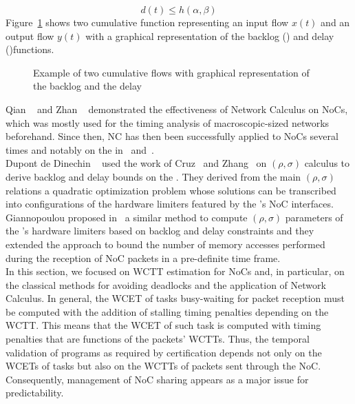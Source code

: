 \documentclass[main.tex]{subfiles}
\begin{document}
\begin{equation}
    \label{eq_stateOftheArt_NCdelay}
    d(t)  \leq h( \alpha , \beta )
\end{equation}
Figure~\ref{fig_stateOfTheArt_NCcumulCurves} shows two cumulative function representing an input flow $x(t)$ and an output flow  $y(t)$ with a graphical representation of the backlog () and delay ()functions.

\begin{figure}
    \centering
    \scalebox{1.3}{}
    \caption{Example of two cumulative flows with graphical representation of the backlog and the delay}
    \label{fig_stateOfTheArt_NCcumulCurves}
\end{figure}


Qian \etal~\cite{Qian2009, Qian2010} and Zhan \etal~\cite{Zhan2013} demonstrated the effectiveness of Network Calculus on NoCs, which was mostly used for the timing analysis of macroscopic-sized networks beforehand. Since then, NC has then been successfully applied to NoCs several times and notably on the \mppalong in~\cite{Dinechin2014} and~\cite{Giannopoulou2015}. \\

Dupont de Dinechin \etal~\cite{Dinechin2014} used the work of Cruz~\cite{Cruz91} and Zhang~\cite{Zhang1995} on $(\rho , \sigma)$ calculus to derive backlog and delay bounds on the \mppalong. They derived from the main $(\rho , \sigma)$ relations a quadratic optimization problem whose solutions can be transcribed into configurations of the hardware limiters featured by the \mppalong's NoC interfaces. Giannopoulou \etal proposed in~\cite{Giannopoulou2015} a similar method to compute $(\rho , \sigma)$ parameters of the \mppalong's hardware limiters based on backlog and delay constraints and they extended the approach to bound the number of memory accesses performed during the reception of NoC packets in a pre-definite time frame. \\

In this section, we focused on WCTT estimation for NoCs and, in particular, on the classical methods for avoiding deadlocks and the application of Network Calculus. In general, the WCET of tasks busy-waiting for packet reception must be computed with the addition of stalling timing penalties depending on the WCTT. This means that the WCET of such task is computed with timing penalties that are functions of the packets' WCTTs. Thus, the temporal validation of programs as required by certification depends not only on the WCETs of tasks but also on the WCTTs of packets sent through the NoC. Consequently, management of NoC sharing appears as a major issue for predictability. \\
\end{document}
